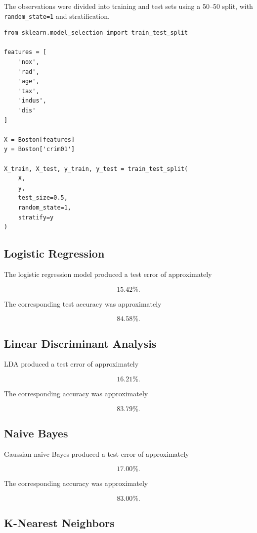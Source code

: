 \documentclass[12pt,a4paper]{article}
\begin{document}
The observations were divided into training and test sets using a 50--50
split, with \texttt{random\_state=1} and stratification.

\begin{lstlisting}
from sklearn.model_selection import train_test_split

features = [
    'nox',
    'rad',
    'age',
    'tax',
    'indus',
    'dis'
]

X = Boston[features]
y = Boston['crim01']

X_train, X_test, y_train, y_test = train_test_split(
    X,
    y,
    test_size=0.5,
    random_state=1,
    stratify=y
)
\end{lstlisting}

\subsection{Logistic Regression}

The logistic regression model produced a test error of approximately

\[
\boxed{15.42\%}.
\]

The corresponding test accuracy was approximately

\[
\boxed{84.58\%}.
\]

\subsection{Linear Discriminant Analysis}

LDA produced a test error of approximately

\[
\boxed{16.21\%}.
\]

The corresponding accuracy was approximately

\[
\boxed{83.79\%}.
\]

\subsection{Naive Bayes}

Gaussian naive Bayes produced a test error of approximately

\[
\boxed{17.00\%}.
\]

The corresponding accuracy was approximately

\[
\boxed{83.00\%}.
\]

\subsection{K-Nearest Neighbors}
\end{document}
